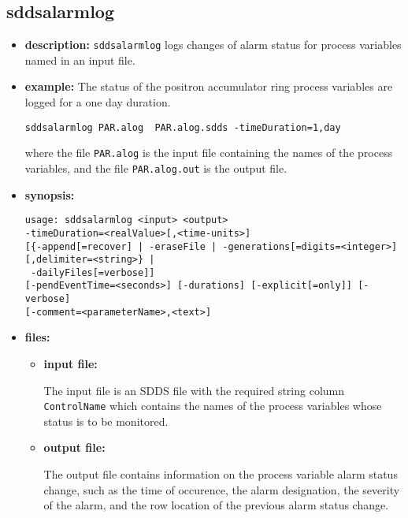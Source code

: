 %
%
\begin{latexonly}
\newpage
\end{latexonly}

%
%
\subsection{sddsalarmlog}
\label{sddsalarmlog}

\begin{itemize}
\item {\bf description:}
%
%
\verb+sddsalarmlog+ logs changes of alarm status for process variables named in an input file.
\item {\bf example:} 
%
% 
%
The status of the positron accumulator ring process variables are logged
for a one day duration.
\begin{verbatim}
sddsalarmlog PAR.alog  PAR.alog.sdds -timeDuration=1,day 
\end{verbatim}
where the file \verb+PAR.alog+ is the input file containing the names of the
process variables, and the file \verb+PAR.alog.out+ is the output file.

\item {\bf synopsis:} 
%
%
\begin{verbatim}
usage: sddsalarmlog <input> <output> 
-timeDuration=<realValue>[,<time-units>]
[{-append[=recover] | -eraseFile | -generations[=digits=<integer>][,delimiter=<string>} |
 -dailyFiles[=verbose]]
[-pendEventTime=<seconds>] [-durations] [-explicit[=only]] [-verbose]
[-comment=<parameterName>,<text>] 
\end{verbatim}

\item {\bf files:}
\begin{itemize}
\item {\bf input file:}\par
The input file is an SDDS file with the required string column {\tt ControlName}
which contains the names of the process variables whose status is to be monitored.

\item {\bf output file:}\par
The output file contains information on the process variable alarm status
change, such as the time of occurence, the alarm designation, the severity of the alarm, and the
row location of the previous alarm status change.


\end{itemize}
\end{itemize}
